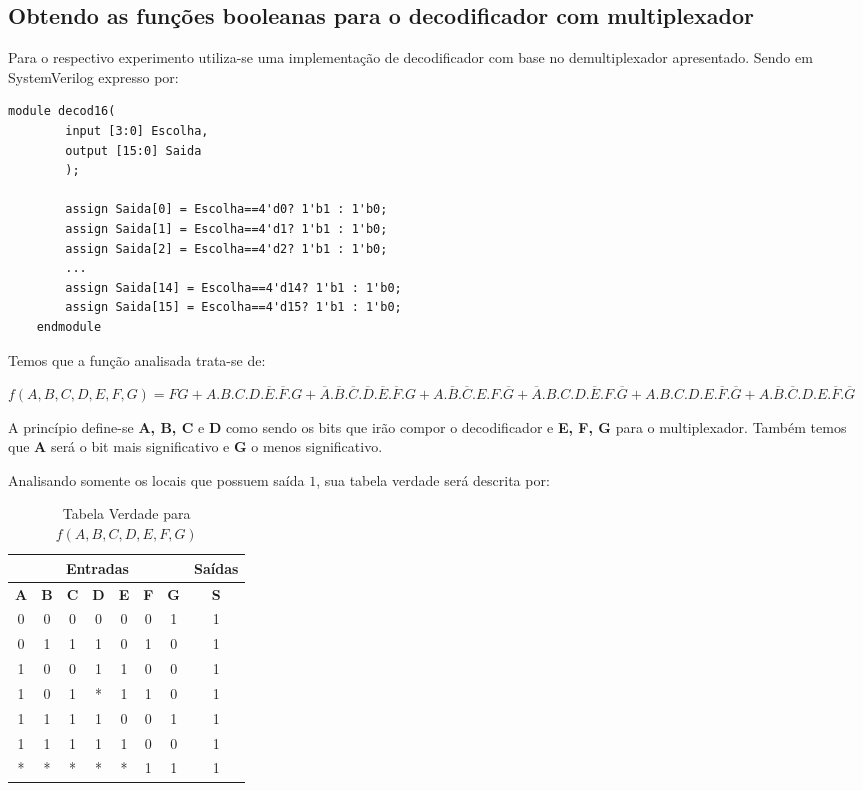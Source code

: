 \documentclass[12pt]{article}
\begin{document}
\subsection{Obtendo as funções booleanas para o decodificador com multiplexador}\label{sec:2.3}

Para o respectivo experimento utiliza-se uma implementação de decodificador com base no demultiplexador apresentado. Sendo em SystemVerilog expresso por:

\begin{center}
    \begin{lstlisting}[style={verilog-style}]
    module decod16(
        input [3:0] Escolha,
        output [15:0] Saida
        );

        assign Saida[0] = Escolha==4'd0? 1'b1 : 1'b0;
        assign Saida[1] = Escolha==4'd1? 1'b1 : 1'b0;
        assign Saida[2] = Escolha==4'd2? 1'b1 : 1'b0;
        ...
        assign Saida[14] = Escolha==4'd14? 1'b1 : 1'b0;
        assign Saida[15] = Escolha==4'd15? 1'b1 : 1'b0;
    endmodule
    \end{lstlisting}
    \label{code:full_adder}
\end{center}

Temos que a função analisada trata-se de:

$f(A,B,C,D,E,F,G)=FG+A.B.C.D.\overline{E}.\overline{F}.G+\overline{A}.\overline{B}.\overline{C}.\overline{D}.\overline{E}.\overline{F}.G+A.\overline{B}.\overline{C}.E.F.\overline{G}+\overline{A}.B.C.D.\overline{E}.F.\overline{G}+A.B.C.D.E.\overline{F}.\overline{G}+A.\overline{B}.\overline{C}.D.E.\overline{F}.\overline{G}$

A princípio define-se \textbf{A, B, C} e \textbf{D} como sendo os bits que irão compor o decodificador e \textbf{E, F, G} para o multiplexador. Também temos que \textbf{A} será o bit mais significativo e \textbf{G} o menos significativo.

Analisando somente os locais que possuem saída $1$, sua tabela verdade será descrita por:

\begin{table}[H]
    \centering
    \caption{Tabela Verdade para $f(A,B,C,D,E,F,G)$}
    \begin{tabular}{|c|c|c|c|c|c|c||c|}\hline
    \multicolumn{7}{|c||}{Entradas} & \multicolumn{1}{|c|}{Saídas} \\\hline
    \textbf{A} & \textbf{B} & \textbf{C} & \textbf{D} & \textbf{E} & \textbf{F} & \textbf{G} & \textbf{S} \\\hline
    0 & 0 & 0 & 0 & 0 & 0 & 1 & 1 \\\hline
    0 & 1 & 1 & 1 & 0 & 1 & 0 & 1 \\\hline
    1 & 0 & 0 & 1 & 1 & 0 & 0 & 1 \\\hline
    1 & 0 & 1 & * & 1 & 1 & 0 & 1 \\\hline
    1 & 1 & 1 & 1 & 0 & 0 & 1 & 1 \\\hline
    1 & 1 & 1 & 1 & 1 & 0 & 0 & 1 \\\hline
    * & * & * & * & * & 1 & 1 & 1 \\\hline
    \end{tabular}\label{tab:truth_table_full_adder}
\end{table}
\end{document}

